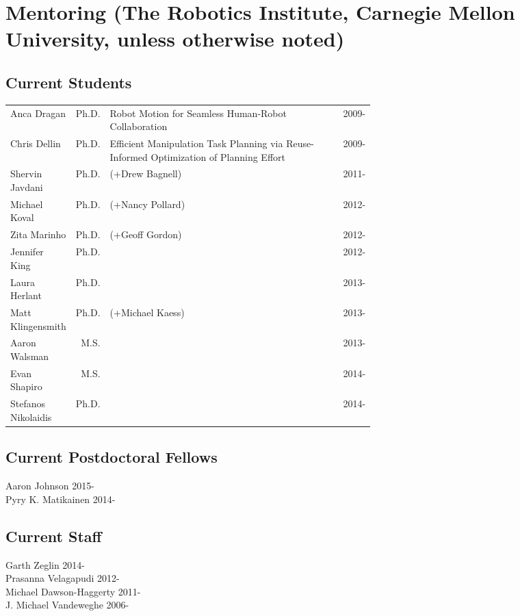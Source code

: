 \documentclass[10pt]{article}
\begin{document}
\section{Mentoring (The Robotics Institute, Carnegie Mellon University, unless otherwise noted)} 
\subsection{Current Students}
\vspace{-1em}
\begin{center}
\begin{tabular}{lrp{0.62\linewidth}ll}
Anca Dragan & Ph.D.  &Robot Motion for Seamless Human-Robot Collaboration & &2009-\\
Chris Dellin & Ph.D.  & Efficient Manipulation Task Planning via Reuse-Informed Optimization of Planning Effort  & &2009-\\
Shervin Javdani & Ph.D. &(+Drew Bagnell) & & 2011-\\
Michael Koval & Ph.D. &(+Nancy Pollard) & & 2012-\\ 
Zita Marinho & Ph.D. &(+Geoff Gordon) & & 2012-\\
Jennifer King & Ph.D. & & & 2012-\\ 
Laura Herlant & Ph.D. & & & 2013-\\
Matt Klingensmith & Ph.D. &(+Michael Kaess) & & 2013-\\
Aaron Walsman & M.S. & & & 2013-\\
Evan Shapiro & M.S. & & & 2014-\\
Stefanos Nikolaidis & Ph.D. & & & 2014-
\end{tabular}
\end{center}

\subsection{Current Postdoctoral Fellows}
\noindent
Aaron Johnson \hfill 2015-\\
Pyry K. Matikainen \hfill 2014-\\

\subsection{Current Staff}
\noindent
Garth Zeglin \hfill 2014-\\
Prasanna Velagapudi \hfill 2012-\\
Michael Dawson-Haggerty \hfill 2011-\\
J. Michael Vandeweghe \hfill 2006-\\
\end{document}
